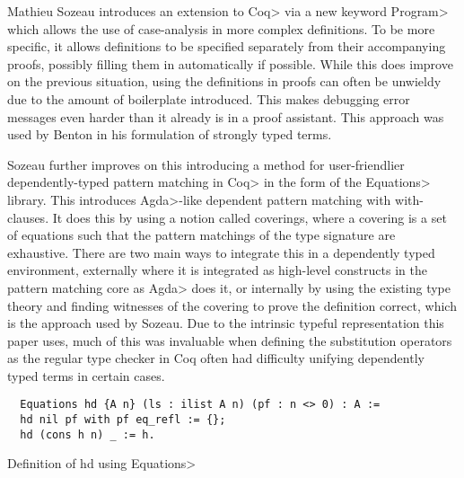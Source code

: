 Mathieu Sozeau introduces an extension to \<Coq> via a new keyword \<Program> which allows the use of case-analysis in more complex definitions\cite{Sozeau2006}\cite{Sozeau2007}.
To be more specific, it allows definitions to be specified separately from their accompanying proofs, possibly filling them in automatically if possible.
While this does improve on the previous situation, using the definitions in proofs can often be unwieldy due to the amount of boilerplate introduced.
This makes debugging error messages even harder than it already is in a proof assistant. This approach was used by Benton in his formulation of strongly typed terms.

Sozeau further improves on this introducing a method for user-friendlier dependently-typed pattern matching in \<Coq> in the form of the \<Equations> library\cite{Sozeau2010}\cite{Sozeau2019}.
This introduces \<Agda>-like dependent pattern matching with with-clauses.
It does this by using a notion called coverings, where a covering is a set of equations such that the pattern matchings of the type signature are exhaustive.
There are two main ways to integrate this in a dependently typed environment, externally where it is integrated as high-level constructs in the pattern matching core as \<Agda> does it, or internally by using the existing type theory and finding witnesses of the covering to prove the definition correct, which is the approach used by Sozeau.
Due to the intrinsic typeful representation this paper uses, much of this was invaluable when defining the substitution operators as the regular type checker in Coq often had difficulty unifying dependently typed terms in certain cases.

\begin{listing}
  \begin{verbatim}
  Equations hd {A n} (ls : ilist A n) (pf : n <> 0) : A :=
  hd nil pf with pf eq_refl := {};
  hd (cons h n) _ := h.
  \end{verbatim}
  \caption{Definition of hd using \<Equations>}
  \label{lst:dt_ilist_hd_equations}
\end{listing}

